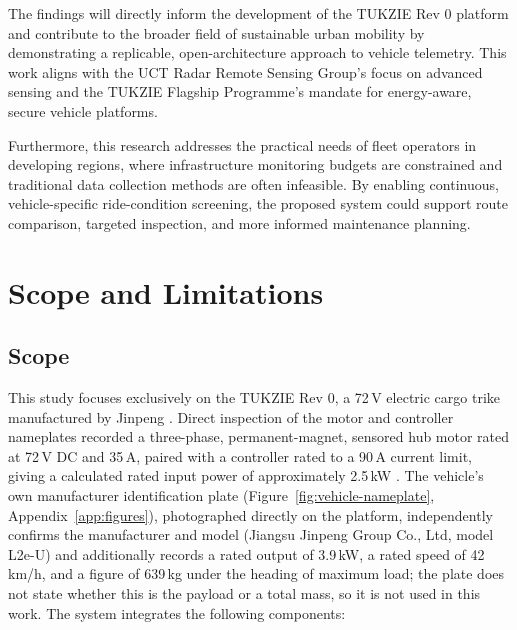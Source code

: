 The findings will directly inform the development of the TUKZIE Rev 0 platform and contribute to the broader field of sustainable urban mobility by demonstrating a replicable, open-architecture approach to vehicle telemetry. This work aligns with the UCT Radar Remote Sensing Group's focus on advanced sensing and the TUKZIE Flagship Programme's mandate for energy-aware, secure vehicle platforms.

Furthermore, this research addresses the practical needs of fleet operators in developing regions, where infrastructure monitoring budgets are constrained and traditional data collection methods are often infeasible. By enabling continuous, vehicle-specific ride-condition screening, the proposed system could support route comparison, targeted inspection, and more informed maintenance planning.

\section{Scope and Limitations}

\subsection{Scope}

This study focuses exclusively on the TUKZIE Rev 0, a 72\,V electric cargo trike manufactured by Jinpeng \cite{jinpengmanual}. Direct inspection of the motor and controller nameplates recorded a three-phase, permanent-magnet, sensored hub motor rated at 72\,V DC and 35\,A, paired with a controller rated to a 90\,A current limit, giving a calculated rated input power of approximately 2.5\,kW \cite{adamsrasara2026}. The vehicle's own manufacturer identification plate (Figure~\ref{fig:vehicle-nameplate}, Appendix~\ref{app:figures}), photographed directly on the platform, independently confirms the manufacturer and model (Jiangsu Jinpeng Group Co., Ltd, model L2e-U) and additionally records a rated output of 3.9\,kW, a rated speed of 42\,km/h, and a figure of 639\,kg under the heading of maximum load; the plate does not state whether this is the payload or a total mass, so it is not used in this work. The system integrates the following components:


